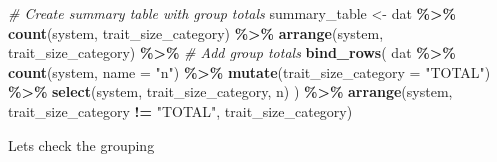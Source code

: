 \documentclass[
]{article}
\newenvironment{Shaded}{\begin{snugshade}}{\end{snugshade}}
\newcommand{\AttributeTok}[1]{\textcolor[rgb]{0.13,0.29,0.53}{#1}}
\newcommand{\CommentTok}[1]{\textcolor[rgb]{0.56,0.35,0.01}{\textit{#1}}}
\newcommand{\ConstantTok}[1]{\textcolor[rgb]{0.56,0.35,0.01}{#1}}
\newcommand{\FunctionTok}[1]{\textcolor[rgb]{0.13,0.29,0.53}{\textbf{#1}}}
\newcommand{\NormalTok}[1]{#1}
\newcommand{\OtherTok}[1]{\textcolor[rgb]{0.56,0.35,0.01}{#1}}
\newcommand{\SpecialCharTok}[1]{\textcolor[rgb]{0.81,0.36,0.00}{\textbf{#1}}}
\newcommand{\StringTok}[1]{\textcolor[rgb]{0.31,0.60,0.02}{#1}}
\begin{document}
\begin{Shaded}
\begin{Highlighting}[]
\CommentTok{\# Create summary table with group totals}
\NormalTok{summary\_table }\OtherTok{\textless{}{-}}\NormalTok{ dat }\SpecialCharTok{\%\textgreater{}\%}
  \FunctionTok{count}\NormalTok{(system, trait\_size\_category) }\SpecialCharTok{\%\textgreater{}\%}
  \FunctionTok{arrange}\NormalTok{(system, trait\_size\_category) }\SpecialCharTok{\%\textgreater{}\%}
  \CommentTok{\# Add group totals}
  \FunctionTok{bind\_rows}\NormalTok{(}
\NormalTok{    dat }\SpecialCharTok{\%\textgreater{}\%}
      \FunctionTok{count}\NormalTok{(system, }\AttributeTok{name =} \StringTok{"n"}\NormalTok{) }\SpecialCharTok{\%\textgreater{}\%}
      \FunctionTok{mutate}\NormalTok{(}\AttributeTok{trait\_size\_category =} \StringTok{"TOTAL"}\NormalTok{) }\SpecialCharTok{\%\textgreater{}\%}
      \FunctionTok{select}\NormalTok{(system, trait\_size\_category, n)}
\NormalTok{  ) }\SpecialCharTok{\%\textgreater{}\%}
  \FunctionTok{arrange}\NormalTok{(system, trait\_size\_category }\SpecialCharTok{!=} \StringTok{"TOTAL"}\NormalTok{, trait\_size\_category)}
\end{Highlighting}
\end{Shaded}

Lets check the grouping

\begin{Shaded}
\end{Shaded}
\end{document}
